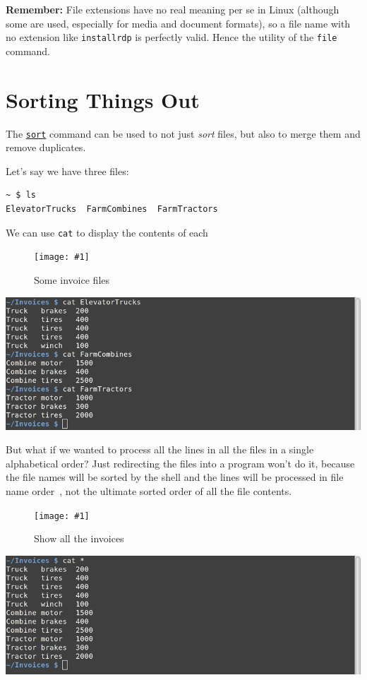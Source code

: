 \documentclass[10pt,]{book}
\numberwithin{figure}{chapter}
\DeclareRobustCommand{\fimg}[3]{
\ifxetex
\begin{figure}[H]
\texttt{[image: \#1]}
\caption{#2}
\label{fig:#3}
\end{figure}
\fi}
\DeclareRobustCommand{\fref}[1]{\ifxetex{(Figure \ref{fig:#1})}\fi}
\begin{document}
\textbf{Remember:} File extensions have no real meaning per se in Linux
(although some are used, especially for media and document formats), so
a file name with no extension like \texttt{installrdp} is perfectly
valid. Hence the utility of the \texttt{file} command.

\section{Sorting Things Out}\label{sorting-things-out}

The \href{http://linux.die.net/man/1/sort}{\texttt{sort}} command can be
used to not just \emph{sort} files, but also to merge them and remove
duplicates.

Let's say we have three files:

\begin{verbatim}
~ $ ls
ElevatorTrucks  FarmCombines  FarmTractors
\end{verbatim}

We can use \texttt{cat} to display the contents of
each~\fref{invoice-files}

\ifxetex\fimg{./images/invoice-files.png}{Some invoice files}{invoice-files}
\else
\includegraphics{./images/invoice-files.png} \fi

But what if we wanted to process all the lines in all the files in a
single alphabetical order? Just redirecting the files into a program
won't do it, because the file names will be sorted by the shell and the
lines will be processed in file name order~\fref{all-invoices}, not the
ultimate sorted order of all the file contents.

\ifxetex\fimg{./images/all-invoices.png}{Show all the invoices}{all-invoices}
\else
\includegraphics{./images/all-invoices.png} \fi
\end{document}
